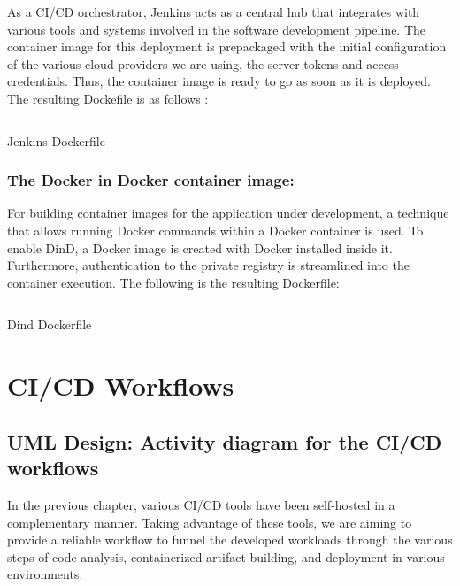 As a CI/CD orchestrator, Jenkins acts as a central hub that integrates with various tools and systems involved in the software development pipeline. The container image for this deployment is prepackaged with the initial configuration of the various cloud providers we are using, the server tokens and access credentials. Thus, the container image is ready to go as soon as it is deployed. The resulting Dockefile is as follows : 

\begin{listing}[H]
    \inputminted{Dockerfile}{codeListing/jenkins_Dockerfile}
    \caption{Jenkins Dockerfile}
    \label{lst:Jenkins Dockerfile}
\end{listing}

\subsubsection{The Docker in Docker container image: }

For building container images for the application under development, a technique that allows running Docker commands within a Docker container is used. To enable DinD, a Docker image is created with Docker installed inside it. Furthermore, authentication to the private registry is streamlined into the container execution. The following is the resulting Dockerfile: 

\begin{listing}[H]
    \inputminted{Dockerfile}{codeListing/dind-Dockerfile}
    \caption{Dind Dockerfile}
    \label{lst:Dind Dockerfile}
\end{listing}


\section{CI/CD Workflows}

\subsection{UML Design: Activity diagram for the CI/CD workflows } 

In the previous chapter, various CI/CD tools have been self-hosted in a complementary manner. Taking advantage of these tools, we are aiming to provide a reliable workflow to funnel the developed workloads through the various steps of code analysis, containerized artifact building, and deployment in various environments.  

 

